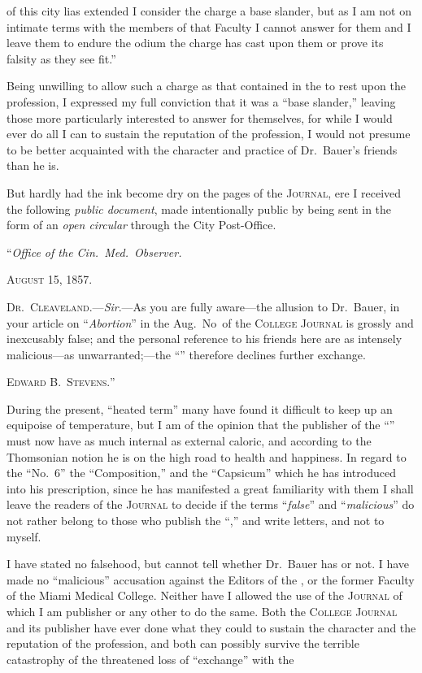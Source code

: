 of this city lias extended I consider the charge a base slander, but as I
am not on intimate terms with the members of that Faculty I cannot
answer for them and I leave them to endure the odium the charge has
cast upon them or prove its falsity as they see fit.''

Being unwilling to allow such a charge as that contained in the
 to rest upon the profession, I expressed my full conviction
that it was a ``base slander,'' leaving those more particularly interested
to answer for themselves, for while I would ever do all I can to sustain
the reputation of the profession, I would not presume to be better
acquainted with the character and practice of Dr.\ Bauer's friends
than he is.

But hardly had the ink become dry on the pages of the \textsc{Journal}, ere
I received the following \emph{public document}, made intentionally public by
being sent in the form of an \emph{open circular} through the City Post-Office.

\hfill{}``\emph{Office of the Cin.\ Med.\ Observer.}\quad

\hfill{}\textsc{August 15, 1857.}\quad

\textsc{Dr.\ Cleaveland}.---\emph{Sir}.---As you are fully aware---the allusion to
Dr.\ Bauer, in your article on ``\emph{Abortion}'' in the Aug.\ No\ of the
\textsc{College Journal} is grossly and inexcusably false; and the personal
reference to his friends here are as intensely malicious---as unwarranted;---the
``'' therefore declines further exchange.

\hfill{}\textsc{Edward B.\ Stevens.}''\quad

During the present, ``heated term'' many have found it difficult to
keep up an equipoise of temperature, but I am of the opinion that the
publisher of the ``'' must now have as much internal as
external caloric, and according to the Thomsonian notion he is on
the high road to health and happiness. In regard to the ``No.\ 6'' the
``Composition,'' and the ``Capsicum'' which he has introduced into
his prescription, since he has manifested a great familiarity with them
I shall leave the readers of the \textsc{Journal} to decide if the terms ``\emph{false}''
and ``\emph{malicious}'' do not rather belong to those who publish the ``,''
and write letters, and not to myself.

I have stated no falsehood, but cannot tell whether Dr.\ Bauer has
or not. I have made no ``malicious'' accusation against the Editors of
the , or the former Faculty of the Miami Medical College.
Neither have I allowed the use of the \textsc{Journal} of which I am publisher
or any other to do the same. Both the \textsc{College Journal} and
its publisher have ever done what they could to sustain the character
and the reputation of the profession, and both can possibly survive
the terrible catastrophy of the threatened loss of ``exchange'' with the\endinput

